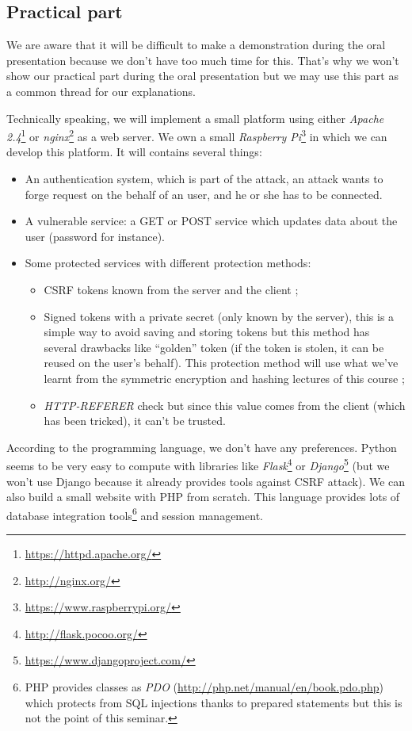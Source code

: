 \documentclass[a4paper,11pt]{article}
\begin{document}
  \subsection{Practical part}
  
  We are aware that it will be difficult to make a demonstration during the oral presentation 
  because we don't have too much time for this. That's why we won't show our practical part 
  during the oral presentation but we may use this part as a common thread for our explanations. 
  
  Technically speaking, we will implement a small platform using either \textit{Apache 2.4}\footnote{\url{https://httpd.apache.org/}} or \textit{nginx}\footnote{\url{http://nginx.org/}} as a web 
  server. We own a small \textit{Raspberry Pi}\footnote{\url{https://www.raspberrypi.org/}} in which we can develop this platform. It will contains several 
  things:
  \begin{itemize}
   \item An authentication system, which is part of the attack, an attack wants to forge request on the behalf of an user, and he or she has to be connected.
   \item A vulnerable service: a GET or POST service which updates data about the user (password for instance).
   \item Some protected services with different protection methods:
   \begin{itemize}
    \item CSRF tokens known from the server and the client ;
    \item Signed tokens with a private secret (only known by the server), this is a simple way to avoid saving and storing tokens but this method has several drawbacks like ``golden'' token (if the token is stolen, it can be reused on the user's behalf). This protection method will use what we've learnt from the symmetric encryption and hashing lectures of this course ;
    \item \textit{HTTP-REFERER} check but since this value comes from the client (which has been tricked), it can't be trusted.
   \end{itemize}
  \end{itemize}
  
  According to the programming language, we don't have any preferences. Python seems to be very easy to 
  compute with libraries like \textit{Flask}\footnote{\url{http://flask.pocoo.org/}} or 
  \textit{Django}\footnote{\url{https://www.djangoproject.com/}} (but we won't use Django because it 
  already provides tools against CSRF attack). We can also build a small website with PHP from 
  scratch. This language provides lots of database integration tools\footnote{PHP provides classes as \textit{PDO} (\url{http://php.net/manual/en/book.pdo.php}) 
  which protects from SQL injections thanks to prepared statements but this is not the point of this seminar.} 
  and session management.
  
\end{document}
